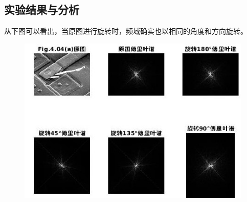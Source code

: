 \documentclass[logo,reportComp]{thesis}
\begin{document}
\subsection{实验结果与分析}
从下图可以看出，当原图进行旋转时，频域确实也以相同的角度和方向旋转。
\begin{figure}[H]
\centering
\includegraphics[width=\linewidth]{fig/06.jpg}
\end{figure}


\appendix\appendixconfig
\end{document}
